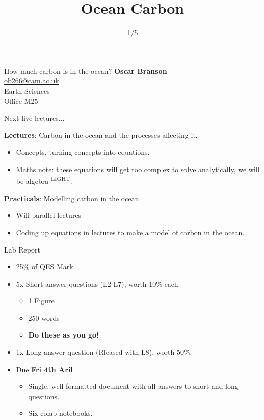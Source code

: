\documentclass[aspectratio=169]{beamer}
\title{Ocean Carbon}
\author{1/5}
\begin{document}
\begin{frame}{How much carbon is in the ocean?}
    \textbf{Oscar Branson} \\ 
    \bigskip
    \href{mailto:ob266@cam.ac.uk}{ob266@cam.ac.uk} \\
    Earth Sciences \\
    Office M25
\end{frame}

\begin{frame}{Next five lectures...}

\textbf{Lectures}: Carbon in the ocean and the processes affecting it.

\begin{itemize}
    \item Concepts, turning concepts into equations. 
    \item Maths note: these equations will get too complex to solve analytically, we will be algebra \textsuperscript{LIGHT}.
\end{itemize}

\bigskip

\textbf{Practicals}: Modelling carbon in the ocean.

\begin{itemize}
    \item Will parallel lectures
    \item Coding up equations in lectures to make a model of carbon in the ocean.
\end{itemize}

\end{frame}

\begin{frame}{Lab Report}
    \begin{itemize}
        \item 25\% of QES Mark
        \item 5x Short answer questions (L2-L7), worth 10\% each.
        \begin{itemize}
            \item 1 Figure
            \item 250 words
            \item \textbf{Do these as you go!}
        \end{itemize}
        \item 1x Long answer question (Rleased with L8), worth 50\%.
        \item Due \textbf{Fri 4th Aril}
        \begin{itemize}
            \item Single, well-formatted document with all answers to short and long questions.
            \item Six colab notebooks.
        \end{itemize} 
    \end{itemize}
\end{frame}
\end{document}
